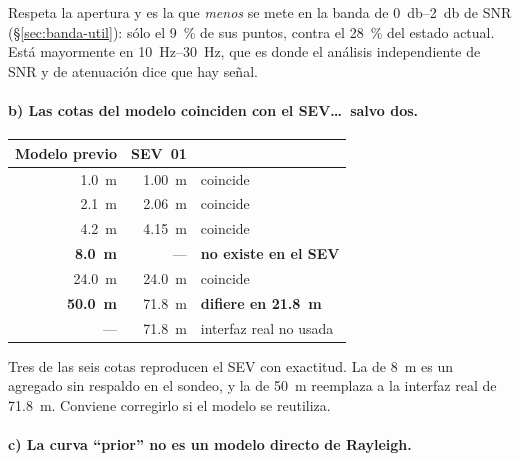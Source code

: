 Respeta la apertura y es la que \emph{menos} se mete en la banda de
\SIrange{0}{2}{\decibel} de SNR (\S\ref{sec:banda-util}): s\'olo el
\SI{9}{\percent} de sus puntos, contra el \SI{28}{\percent} del estado actual.
Est\'a mayormente en \SIrange{10}{30}{\hertz}, que es donde el an\'alisis
independiente de SNR y de atenuaci\'on dice que hay se\~nal.

\paragraph{b) Las cotas del modelo coinciden con el SEV\ldots\ salvo dos.}

\begin{center}\footnotesize
\begin{tabular}{@{}rrl@{}}
\toprule
Modelo previo & SEV~01 & \\
\midrule
\SI{1.0}{\meter} & \SI{1.00}{\meter} & coincide \\
\SI{2.1}{\meter} & \SI{2.06}{\meter} & coincide \\
\SI{4.2}{\meter} & \SI{4.15}{\meter} & coincide \\
\textbf{\SI{8.0}{\meter}} & --- & \textbf{no existe en el SEV} \\
\SI{24.0}{\meter} & \SI{24.0}{\meter} & coincide \\
\textbf{\SI{50.0}{\meter}} & \SI{71.8}{\meter} & \textbf{difiere en \SI{21.8}{\meter}} \\
--- & \SI{71.8}{\meter} & interfaz real no usada \\
\bottomrule
\end{tabular}
\end{center}

Tres de las seis cotas reproducen el SEV con exactitud. La de \SI{8}{\meter} es
un agregado sin respaldo en el sondeo, y la de \SI{50}{\meter} reemplaza a la
interfaz real de \SI{71.8}{\meter}. Conviene corregirlo si el modelo se reutiliza.

\paragraph{c) La curva ``prior'' no es un modelo directo de Rayleigh.}

